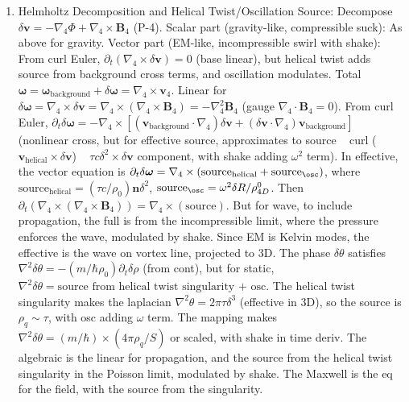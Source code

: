 \begin{enumerate}
\item Helmholtz Decomposition and Helical Twist/Oscillation Source: Decompose $\delta\mathbf{v} = - \nabla_4 \Phi + \nabla_4 \times \mathbf{B}_4$ (P-4). Scalar part (gravity-like, compressible suck): As above for gravity. Vector part (EM-like, incompressible swirl with shake): From curl Euler, $\partial_t (\nabla_4 \times \delta\mathbf{v}) = 0$ (base linear), but helical twist adds source from background cross terms, and oscillation modulates. Total $\boldsymbol{\omega} = \boldsymbol{\omega}_{\text{background}} + \delta\boldsymbol{\omega} = \nabla_4 \times \mathbf{v}_4$. Linear for $\delta\boldsymbol{\omega} = \nabla_4 \times \delta\mathbf{v} = \nabla_4 \times (\nabla_4 \times \mathbf{B}_4) = - \nabla_4^2 \mathbf{B}_4$ (gauge $\nabla_4 \cdot \mathbf{B}_4 = 0$). From curl Euler, $\partial_t \delta\boldsymbol{\omega} = - \nabla_4 \times [(\mathbf{v}_{\text{background}} \cdot \nabla_4) \delta\mathbf{v} + (\delta\mathbf{v} \cdot \nabla_4) \mathbf{v}_{\text{background}}]$ (nonlinear cross, but for effective source, approximates to source ~ curl ($\mathbf{v}_{\text{helical}} \times \delta\mathbf{v}$) ~ $\tau c \delta^2 \times \delta\mathbf{v}$ component, with shake adding $\omega^2$ term). In effective, the vector equation is $\partial_t \delta\boldsymbol{\omega} = \nabla_4 \times (\text{source}_{\text{helical}} + \text{source}_{\osc})$, where $\text{source}_{\text{helical}} = (\tau c / \rho_0) \mathbf{n} \delta^2$, $\text{source}_\osc = \omega^2 \delta R / \rho_{4D}^0$. Then $\partial_t (\nabla_4 \times (\nabla_4 \times \mathbf{B}_4)) = \nabla_4 \times (\text{source})$. But for wave, to include propagation, the full is from the incompressible limit, where the pressure enforces the wave, modulated by shake. Since EM is Kelvin modes, the effective is the wave on vortex line, projected to 3D. The phase $\delta\theta$ satisfies $\nabla^2 \delta\theta = - (m / \hbar \rho_0) \partial_t \delta\rho$ (from cont), but for static, $\nabla^2 \delta\theta = \text{source from helical twist singularity + osc}$. The helical twist singularity makes the laplacian $\nabla^2 \theta = 2\pi \tau \delta^3$ (effective in 3D), so the source is $\rho_q \sim \tau$, with osc adding $\omega$ term. The mapping makes $\nabla^2 \delta\theta = (m / \hbar) \times (4\pi \rho_q / S)$ or scaled, with shake in time deriv. The algebraic is the linear for propagation, and the source from the helical twist singularity in the Poisson limit, modulated by shake. The Maxwell is the eq for the field, with the source from the singularity.
\end{enumerate}

